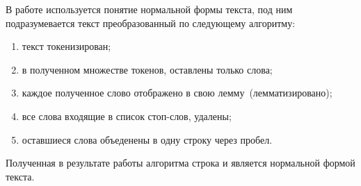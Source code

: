     В работе используется понятие нормальной формы текста, под ним подразумевается текст преобразованный по следующему алгоритму:
    \begin{enumerate}
        \item текст токенизирован;
        \item в полученном множестве токенов, оставлены только слова;
        \item каждое полученное слово отображено в свою лемму~(лемматизировано);
        \item все слова входящие в список стоп-слов, удалены;
        \item оставшиеся слова объеденены в одну строку через пробел.
    \end{enumerate}
    Полученная в результате работы алгоритма строка и является нормальной формой текста.
%
%
%
%
%
%
%
%
